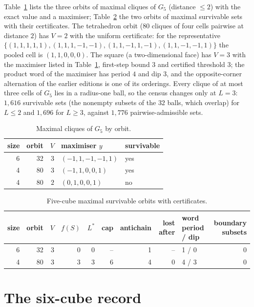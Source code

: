 \documentclass[11pt,a4paper]{article}
\theoremstyle{plain}
\theoremstyle{definition}
\theoremstyle{remark}
\begin{document}
Table~\ref{tab:S3cl} lists the three orbits of maximal cliques of $G_5$ (distance $\le2$) with the exact value and a maximiser; Table~\ref{tab:S3max} the two orbits of maximal survivable sets with their certificates. The tetrahedron orbit ($80$ cliques of four cells pairwise at distance $2$) has $V=2$ with the uniform certificate: for the representative $\{(1,1,1,1,1),(1,1,1,-1,-1),(1,1,-1,1,-1),(1,1,-1,-1,1)\}$ the pooled cell is $(1,1,0,0,0)$. The square (a two-dimensional face) has $V=3$ with the maximiser listed in Table~\ref{tab:S3cl}, first-step bound $3$ and certified threshold $3$; the product word of the maximiser has period $4$ and dip $3$, and the opposite-corner alternation of the earlier editions is one of its orderings. Every clique of at most three cells of $G_5$ lies in a radius-one ball, so the census changes only at $L=3$: $1{,}616$ survivable sets (the nonempty subsets of the $32$ balls, which overlap) for $L\le2$ and $1{,}696$ for $L\ge3$, against $1{,}776$ pairwise-admissible sets.
\begin{table}[H]\centering\small
\caption{Maximal cliques of $G_5$ by orbit.}\label{tab:S3cl}
\begin{tabular}{rrrll}
\toprule
size & orbit & $V$ & maximiser $y$ & survivable\\
\midrule
6 & 32 & $3$ & $(-1,1,-1,-1,1)$ & yes\\
4 & 80 & $3$ & $(-1,1,0,0,1)$ & yes\\
4 & 80 & $2$ & $(0,1,0,0,1)$ & no\\
\bottomrule
\end{tabular}
\end{table}
\begin{table}[H]\centering\small
\caption{Five-cube maximal survivable orbits with certificates.}\label{tab:S3max}
\begin{tabular}{rrrrrrrrlr}
\toprule
size & orbit & $V$ & $f(S)$ & $L^\ast$ & cap & antichain & lost after & word period / dip & boundary subsets\\
\midrule
6 & 32 & $3$ & 0 & 0 & -- & 1 & -- & 1 / 0 & 0\\
4 & 80 & $3$ & 3 & 3 & 6 & 4 & 0 & 4 / 3 & 0\\
\bottomrule
\end{tabular}
\end{table}
\section{The six-cube record}\label{S:six}
\end{document}
